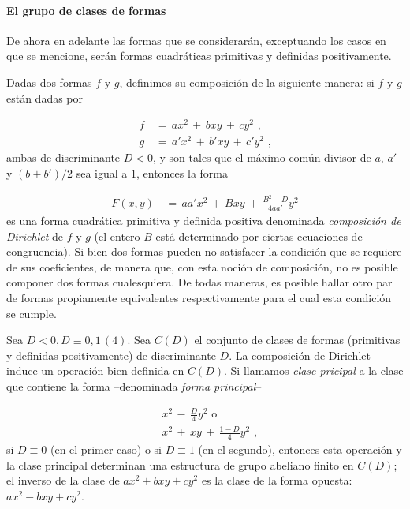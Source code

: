\paragraph{El grupo de clases de formas}
De ahora en adelante las formas que se considerar\'{a}n, exceptuando
los casos en que se mencione, ser\'{a}n formas cuadr\'{a}ticas
primitivas y definidas positivamente.

Dadas dos formas $f$ y $g$, definimos su composici\'{o}n de la
siguiente manera: si $f$ y $g$ est\'{a}n dadas por

\begin{align*}
f & \,=\,ax^{2}\,+\,bxy\,+\,cy^{2}\text{ ,}\\
g & \,=\,a'x^{2}\,+\,b'xy\,+\,c'y^{2}\text{ ,}
\end{align*}
ambas de discriminante $D<0$, y son tales que el m\'{a}ximo com\'{u}n
divisor de $a$, $a'$ y $(b+b')/2$ sea igual a $1$, entonces la forma

\begin{align*}
F(x,y) & \,=\,aa'x^{2}\,+\,Bxy\,+\,\frac{B^{2}-D}{4aa'}y^{2}
\end{align*}
es una forma cuadr\'{a}tica primitiva y definida positiva denominada
\emph{composici\'{o}n de Dirichlet} de $f$ y $g$ (el entero $B$
est\'{a} determinado por ciertas ecuaciones de congruencia). Si bien
dos formas pueden no satisfacer la condici\'{o}n que se requiere de sus
coeficientes, de manera que, con esta noci\'{o}n de composici\'{o}n,
no es posible componer dos formas cualesquiera. De todas maneras,
es posible hallar otro par de formas propiamente equivalentes respectivamente para el cual esta condici\'{o}n se cumple.

\begin{definicionesCompositioGrupoDeClasesDeFormas}
Sea $D<0,D\equiv 0,1\,(4)$. Sea $C(D)$ el conjunto de clases de formas
(primitivas y definidas positivamente) de discriminante $D$. La
composici\'{o}n de Dirichlet induce un operaci\'{o}n bien definida
en $C(D)$. Si llamamos \emph{clase pricipal} a la clase que contiene
la forma --denominada \emph{forma principal}--

\begin{align*}
& x^{2}\,-\,\frac{D}{4}y^{2}\text{ o}\\
& x^{2}\,+\,xy\,+\,\frac{1-D}{4}y^{2}\text{ ,}
\end{align*}
si $D\equiv 0$ (en el primer caso) o si $D\equiv 1$ (en el segundo),
entonces esta operaci\'{o}n y la clase principal determinan una
estructura de grupo abeliano finito en $C(D)$; el inverso de la clase
de $ax^{2}+bxy+cy^{2}$ es la clase de la forma opuesta:
$ax^{2}-bxy+cy^{2}$.
\end{definicionesCompositioGrupoDeClasesDeFormas}

